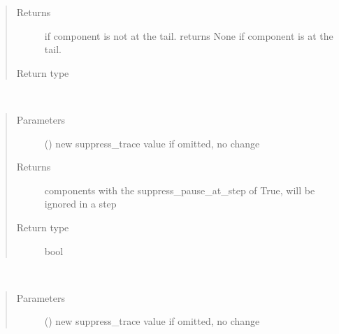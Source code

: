 \documentclass[letterpaper,10pt,english]{sphinxmanual}
\begin{document}
\begin{fulllineitems}
\begin{fulllineitems}
\begin{quote}
\begin{description}
\item[{Returns}] \leavevmode
{} \textendash{} if component is not at the tail. 
returns None if component is at the tail.

\item[{Return type}] \leavevmode
{\hyperref[\detokenize{Reference:salabim.Component}]{}}

\end{description}\end{quote}

\end{fulllineitems}


\begin{fulllineitems}
\label{\detokenize{Reference:salabim.Component.suppress_pause_at_step}}~\begin{quote}\begin{description}
\item[{Parameters}] \leavevmode
{} () \textendash{} new suppress\_trace value 
if omitted, no change

\item[{Returns}] \leavevmode
{} \textendash{} components with the suppress\_pause\_at\_step of True, will be ignored in a step

\item[{Return type}] \leavevmode
bool

\end{description}\end{quote}

\end{fulllineitems}


\begin{fulllineitems}
\label{\detokenize{Reference:salabim.Component.suppress_trace}}~\begin{quote}\begin{description}
\item[{Parameters}] \leavevmode
{} () \textendash{} new suppress\_trace value 
if omitted, no change


\end{description}
\end{quote}
\end{fulllineitems}
\end{fulllineitems}
\end{document}
